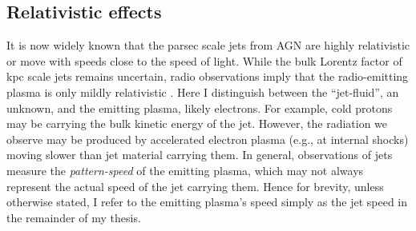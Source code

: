 \subsection{Relativistic effects\label{subsec:relativistic_effects}}
It is now widely known that the parsec scale jets from AGN are highly relativistic or move with speeds close to the speed of light. While the bulk Lorentz factor of kpc scale jets remains uncertain, radio observations imply that the radio-emitting plasma is only mildly relativistic \citep[e.g.,][]{wardle1997fast,mullin2009bayesian}. Here I distinguish between the ``jet-fluid'', an unknown, and the emitting plasma, likely electrons. For example, cold protons may be carrying the bulk kinetic energy of the jet. However, the radiation we observe may be produced by accelerated electron plasma (e.g., at internal shocks) moving slower than jet material carrying them. In general, observations of jets measure the \textit{pattern-speed} of the emitting plasma, which may not always represent the actual speed of the jet carrying them. Hence for brevity, unless otherwise stated, I refer to the emitting plasma's speed simply as the jet speed in the remainder of my thesis.

